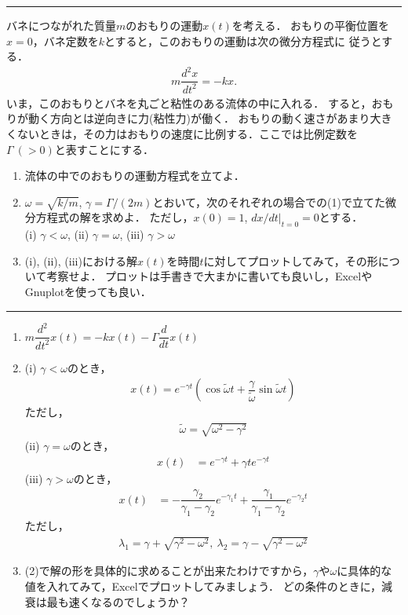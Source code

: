\documentclass[11pt,a4]{jsarticle}
\numberwithin{equation}{section}
\begin{document}
\newpage
\vspace*{.2cm}
\hrule
\enshu
バネにつながれた質量$m$のおもりの運動$x(t)$を考える．
おもりの平衡位置を$x=0$，バネ定数を$k$とすると，このおもりの運動は次の微分方程式に
従うとする．
\begin{align*}
  m\dfrac{d^2x}{dt^2} = -k x. 
\end{align*}
いま，このおもりとバネを丸ごと粘性のある流体の中に入れる．
すると，おもりが動く方向とは逆向きに力(粘性力)が働く．
おもりの動く速さがあまり大きくないときは，その力はおもりの速度に比例する．ここでは比例定数を$\Gamma ~(>0)$と表すことにする．
\begin{enumerate}[(1)]
  \item 流体の中でのおもりの運動方程式を立てよ．
  \item $\omega=\sqrt{k/m}$, $\gamma = \Gamma/(2m)$とおいて，次のそれぞれの場合での(1)で立てた微分方程式の解を求めよ．
	ただし，$x(0)=1$, $dx/dt|_{t=0} = 0$とする．\\
	(i) $\gamma < \omega$, (ii) $\gamma = \omega$, (iii) $\gamma > \omega$
  \item (i), (ii), (iii)における解$x(t)$を時間$t$に対してプロットしてみて，その形について考察せよ．
	プロットは手書きで大まかに書いても良いし，ExcelやGnuplotを使っても良い．
\end{enumerate}
\vspace*{.2cm}
\hrule
%
\begin{enumerate}[(1)]
\item $m\dfrac{d^2}{dt^2}x(t) = -kx(t) -\Gamma \dfrac{d}{dt}x(t)$
\item (i) $\gamma < \omega$のとき，
%
\begin{align*}
 x\left(t\right) = e^{-\gamma t}\left(\cos \tilde{\omega}t + \dfrac{\gamma}{\tilde{\omega}}\sin \tilde{\omega}t\right) 
\end{align*}
ただし，
\begin{align*}
  \tilde{\omega} = \sqrt{\omega^2 - \gamma^2}
\end{align*}
%
(ii) $\gamma = \omega$のとき，
\begin{align*}
x\left(t\right) & =e^{-\gamma t}+\gamma te^{-\gamma t}
\end{align*}
%
(iii) $\gamma > \omega$のとき，
\begin{align*}
x\left(t\right) & =-\dfrac{\gamma_{2}}{\gamma_{1}-\gamma_{2}}e^{-\gamma_{1}t}+\dfrac{\gamma_{1}}{\gamma_{1}-\gamma_{2}}e^{-\gamma_{2}t}
\end{align*}
ただし，
\begin{align*}
  \lambda_1 = \gamma + \sqrt{\gamma^2 - \omega^2}, ~\lambda_2 = \gamma - \sqrt{\gamma^2 - \omega^2} 
\end{align*}
%
\item
%
(2)で解の形を具体的に求めることが出来たわけですから，$\gamma$や$\omega$に具体的な値を入れてみて，Excelでプロットしてみましょう．
どの条件のときに，減衰は最も速くなるのでしょうか？
\end{enumerate}
\end{document}
